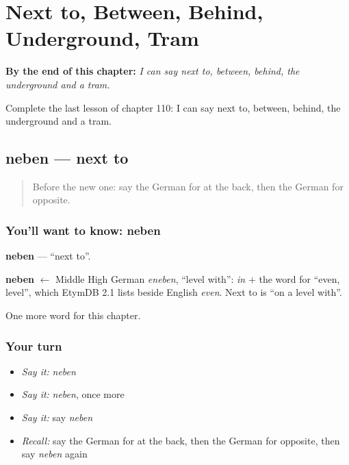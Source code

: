 
\chapter{Next to, Between, Behind, Underground, Tram}
\label{ch:ge-next-to-between-behind-underground-tram}

\begin{chapteropening}
\textbf{By the end of this chapter:} \emph{I can say next to, between, behind, the underground and a tram.}

Complete the last lesson of chapter 110: I can say next to, between, behind, the underground and a tram.
\end{chapteropening}

\section[neben]{neben — next to}

\label{lesson:GE-C110-neben}



\begin{quote}
Before the new one: say the German for at the back, then the German for opposite.
\end{quote}

\subsection*{You'll want to know: neben}
\textbf{neben} — \textquotedblleft{}next to\textquotedblright{}.

\begin{cousinweb}
\textbf{neben} $\leftarrow$ Middle High German \emph{eneben}, \textquotedblleft{}level with\textquotedblright{}: \emph{in} + the word for \textquotedblleft{}even, level\textquotedblright{}, which EtymDB 2.1 lists beside English \emph{even}. Next to is \textquotedblleft{}on a level with\textquotedblright{}.
\end{cousinweb}

\begin{grammarlens}[title={What you've built}]
One more word for this chapter.
\end{grammarlens}

\subsection*{Your turn}
\begin{itemize}
\raggedright
  \item \emph{Say it:} \emph{neben}
  \item \emph{Say it:} \emph{neben}, once more
  \item \emph{Say it:} say \emph{neben}
  \item \emph{Recall:} say the German for at the back, then the German for opposite, then say \emph{neben} again
\end{itemize}

